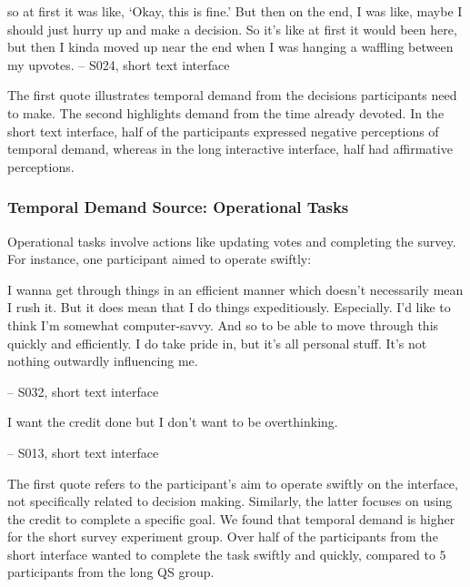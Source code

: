\begin{displayquote}
\bracketellipsis so at first it was like, `Okay, this is fine.' But then on the end, I was like, maybe I should just hurry up and make a decision. So it's like at first it would been here, but then I kinda moved up near the end when I was hanging a waffling between my upvotes.
\noindent \hfill -- S024, short text interface
\end{displayquote}

The first quote illustrates temporal demand from the decisions participants need to make. The second highlights demand from the time already devoted. In the short text interface, half of the participants expressed negative perceptions of temporal demand, whereas in the long interactive interface, half had affirmative perceptions.

\subsubsection{Temporal Demand Source: Operational Tasks}
Operational tasks involve actions like updating votes and completing the survey. For instance, one participant aimed to operate swiftly:

\begin{displayquote}
I wanna get through things in an efficient manner which doesn't necessarily mean I rush it. But it does mean that I do things expeditiously. Especially. I'd like to think I'm somewhat computer-savvy. And so to be able to move through this quickly and efficiently. I do take pride in, but it's all personal stuff. It's not nothing outwardly influencing me. 
        
\noindent \hfill -- S032, short text interface
\end{displayquote}

\begin{displayquote}
I want the credit done but I don't want to be overthinking.
            
\noindent \hfill -- S013, short text interface
\end{displayquote}

The first quote refers to the participant's aim to operate swiftly on the interface, not specifically related to decision making. Similarly, the latter focuses on using the credit to complete a specific goal. We found that temporal demand is higher for the short survey experiment group. Over half of the participants from the short interface wanted to complete the task swiftly and quickly, compared to $5$ participants from the long QS group.

